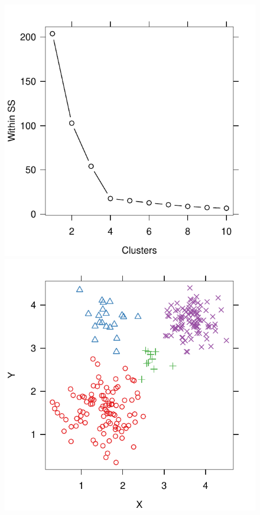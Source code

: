 \documentclass[12pt]{article}
\begin{document}
\begin{figure}
\begin{minipage}{\linewidth}
\begin{minipage}{0.45\linewidth}
    \includegraphics[width=\linewidth]{main_code/demo/elbow/correct-withinss.pdf}
  \end{minipage}
\end{minipage}
\begin{minipage}{\linewidth}
  \begin{minipage}{0.45\linewidth}
    \includegraphics[width=\linewidth]{main_code/demo/elbow/incorrect-data.pdf}

\end{minipage}
\end{minipage}
\end{figure}
\end{document}
